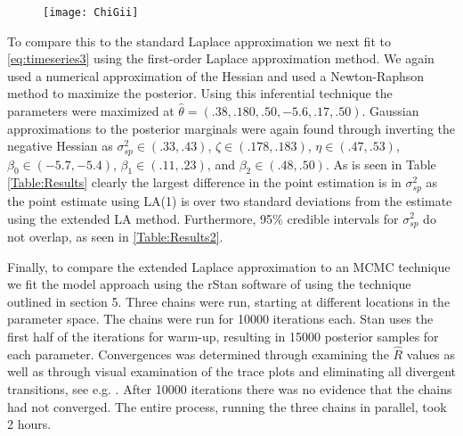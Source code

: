\documentclass[11pt]{isuthesis}
\begin{document}
	
		\begin{figure}[!htp]
			\centering
			\texttt{[image: ChiGii]}
			\label{fig:ChiGii}
		\end{figure}
	
	To compare this to the standard Laplace approximation we next fit to \eqref{eq:timeseries3} using the first-order Laplace approximation method.   We again used a numerical approximation of the Hessian and used a Newton-Raphson method to maximize the posterior.  Using this inferential technique the parameters were maximized at $\hat{\theta}=(.38,.180,.50,-5.6,.17,.50)$.  Gaussian approximations to the posterior marginals were again found through inverting the negative Hessian as $\sigma_{sp}^2 \in (.33,.43)$, $\zeta \in (.178,.183)$, $\eta \in (.47,.53)$, $\beta_0 \in (-5.7,-5.4)$, $\beta_1 \in (.11,.23)$, and $\beta_2 \in (.48,.50)$.  As is seen in Table \ref{Table:Results} clearly the largest difference in the point estimation is in $\sigma_{sp}^2$ as the point estimate using LA(1) is over two standard deviations from the estimate using the extended LA method.  Furthermore, 95\% credible intervals for $\sigma_{sp}^2$ do not overlap, as seen in \ref{Table:Results2}.
	
	Finally, to compare the extended Laplace approximation to an MCMC technique we fit the model approach using the rStan software of \cite{gelman2015stan} using the technique outlined in section 5.  Three chains were run, starting at different locations in the parameter space.  The chains were run for 10000 iterations each.  Stan uses the first half of the iterations for warm-up, resulting in 15000 posterior samples for each parameter.  Convergences was determined through examining the $\hat{R}$ values as well as through visual examination of the trace plots and eliminating all divergent transitions, see e.g. \cite{betancort}. After 10000 iterations there was no evidence that the chains had not converged.  The entire process, running the three chains in parallel, took 2 hours.  
	
\end{document}
